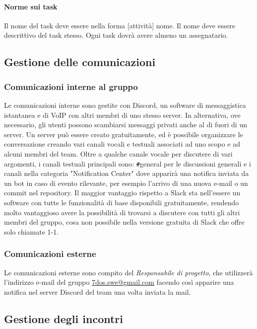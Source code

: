 \paragraph{Norme sui task} \Spazio
Il nome del task deve essere nella forma [attività] nome. Il nome deve essere descrittivo del task stesso. Ogni task dovrà avere almeno un assegnatario.

\subsection{Gestione delle comunicazioni}
\subsubsection{Comunicazioni interne al gruppo}
Le comunicazioni interne sono gestite con Discord, un software di messaggistica istantanea e di VoIP con altri membri di uno stesso server. In alternativa, ove necessario, gli utenti possono scambiarsi messaggi privati anche al di fuori di un server.
Un server può essere creato gratuitamente, ed è possibile organizzare le conversazione creando vari canali vocali e testuali associati ad uno scopo e ad alcuni membri del team.\newline
Oltre a qualche canale vocale per discutere di vari argomenti, i canali testuali principali sono: \verb|#|general per le discussioni generali e i canali nella categoria "Notification Center" dove apparirà una notifica inviata da un bot in caso di evento rilevante, per esempio l'arrivo di una nuova e-mail o un commit nel repository.
\newline
Il maggior vantaggio rispetto a Slack sta nell'essere un software con tutte le funzionalità di base disponibili gratuitamente, rendendo molto vantaggioso avere la possibilità di trovarsi a discutere con tutti gli altri membri del gruppo, cosa non possibile nella versione gratuita di Slack che offre solo chiamate 1-1.

\subsubsection{Comunicazioni esterne}
Le comunicazioni esterne sono compito del \emph{Responsabile di progetto}, che utilizzerà l'indirizzo e-mail del gruppo \href{mailto:7dos.swe@gmail.com}{7dos.swe@gmail.com} facendo così apparire una notifica nel server Discord del team una volta inviata la mail.

\subsection{Gestione degli incontri}
